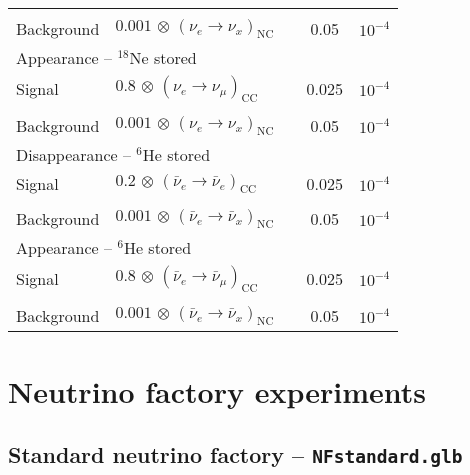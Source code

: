 \begin{appendix}
\begin{center}
\begin{tabular}{|l|ll|c|c|}
 & & & & \\
Background & $0.001 \, \otimes \, (\nu_e \rightarrow \nu_x)_\mathrm{NC}$ & & 0.05 & $10^{-4}$ \\ \hline \hline 
\multicolumn{3}{|l|}{Appearance -- $^{18}$Ne stored} & & \\ \hline
Signal & $0.8 \, \otimes \, (\nu_e \rightarrow \nu_\mu)_\mathrm{CC}$ & & 0.025 & $10^{-4}$ \\
 & & & & \\
Background & $0.001 \, \otimes \, (\nu_e \rightarrow \nu_x)_\mathrm{NC}$ & & 0.05 & $10^{-4}$
\\ \hline \hline
\multicolumn{3}{|l|}{Disappearance -- $^6$He stored} & &  \\ \hline
Signal & $0.2 \, \otimes \, (\bar{\nu}_e\rightarrow\bar{\nu}_e)_{\mathrm{CC}}$ & & 0.025 & $10^{-4}$ \\
 & & & & \\
Background & $0.001 \, \otimes \, (\bar{\nu}_e \rightarrow \bar{\nu}_x)_\mathrm{NC}$ & & 0.05 & $10^{-4}$  \\ \hline \hline 
\multicolumn{3}{|l|}{Appearance -- $^6$He stored} & & \\ \hline
Signal & $0.8 \, \otimes \, (\bar{\nu}_e \rightarrow \bar{\nu}_\mu)_\mathrm{CC}$ & &
0.025 & $10^{-4}$ \\
 & & & & \\
Background & $0.001 \, \otimes \, (\bar{\nu}_e \rightarrow \bar{\nu}_x)_\mathrm{NC}$ & & 0.05 & $10^{-4}$ \\ \hline \hline
\end{tabular}
\end{center}

\section*{Neutrino factory experiments}
\subsection*{Standard neutrino factory -- {\tt NFstandard.glb}}


\end{appendix}
